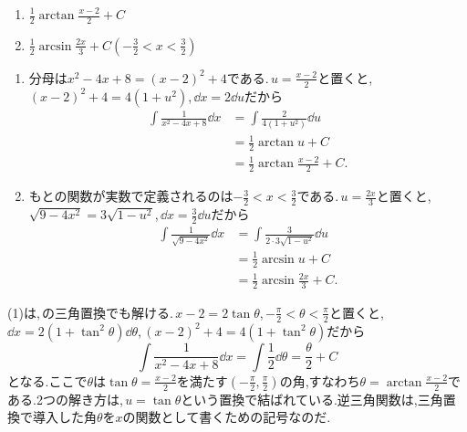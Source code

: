 \begin{enumerate}[label=(\arabic*)]
\item $\frac12\arctan\frac{x-2}{2}+C$
\item $\frac12\arcsin\frac{2x}{3}+C$\quad$\left(-\frac32<x<\frac32\right)$
\end{enumerate}

\begin{enumerate}[label=(\arabic*)]
\item 分母は$x^2-4x+8=(x-2)^2+4$である.\,$u=\frac{x-2}{2}$と置くと,\,$(x-2)^2+4=4(1+u^2)$,\,$\dd x=2\dd u$だから
\begin{align*}
\int\frac1{x^2-4x+8}\dd x
&=\int\frac{2}{4(1+u^2)}\dd u\\
&=\frac12\arctan u+C\\
&=\frac12\arctan\frac{x-2}{2}+C.
\end{align*}
\item もとの関数が実数で定義されるのは$-\frac32<x<\frac32$である.\,$u=\frac{2x}{3}$と置くと,\,$\sqrt{9-4x^2}=3\sqrt{1-u^2}$,\,$\dd x=\frac32\dd u$だから
\begin{align*}
\int\frac1{\sqrt{9-4x^2}}\dd x
&=\int\frac{3}{2\cdot3\sqrt{1-u^2}}\dd u\\
&=\frac12\arcsin u+C\\
&=\frac12\arcsin\frac{2x}{3}+C.
\end{align*}
\end{enumerate}

(1)は,\,の三角置換でも解ける.\,$x-2=2\tan\theta$,\,$-\frac\pi2<\theta<\frac\pi2$と置くと,\,$\dd x=2(1+\tan^2\theta)\dd\theta$,\,$(x-2)^2+4=4(1+\tan^2\theta)$だから
\[
\int\frac1{x^2-4x+8}\dd x
=\int\frac12\dd\theta
=\frac\theta2+C
\]
となる.ここで$\theta$は$\tan\theta=\frac{x-2}{2}$を満たす$\left(-\frac\pi2,\frac\pi2\right)$の角,すなわち$\theta=\arctan\frac{x-2}{2}$である.2つの解き方は,\,$u=\tan\theta$という置換で結ばれている.逆三角関数は,三角置換で導入した角$\theta$を$x$の関数として書くための記号なのだ.
